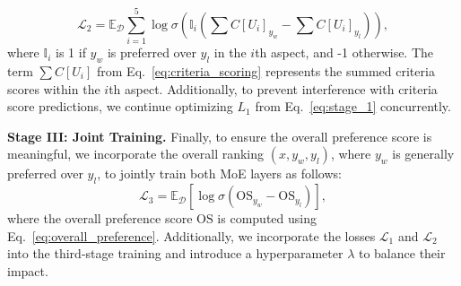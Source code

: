\begin{equation}
    \mathcal{L}_2 = \mathbb{E}_{\mathcal{D}} \sum_{i=1}^{5}  \log \sigma(
          \mathbb{I}_{i} (\sum C[U_i]_{y_w} - \sum C[U_i]_{y_l})
    )
    ,
\end{equation}
where \( \mathbb{I}_{i} \) is 1 if \( y_w \) is preferred over \( y_l \) in the \( i \)th aspect, and -1 otherwise. The term \( \sum C[U_i] \) from Eq.~\eqref{eq:criteria_scoring} represents the summed criteria scores within the \( i \)th aspect. Additionally, to prevent interference with criteria score predictions, we continue optimizing \( L_1 \) from Eq.~\eqref{eq:stage_1} concurrently.

\noindent \textbf{Stage III: Joint Training.}
Finally, to ensure the overall preference score is meaningful, we incorporate the overall ranking \( (x, y_w, y_l) \), where \( y_w \) is generally preferred over \( y_l \), to jointly train both MoE layers as follows:
\begin{equation}
    \mathcal{L}_3 = \mathbb{E}_{\mathcal{D}} \left[ \log \sigma (\textrm{OS}_{y_w} - \textrm{OS}_{y_l})\right]
    ,
\end{equation}
where the overall preference score \(\textrm{OS}\) is computed using Eq.~\eqref{eq:overall_preference}. Additionally, we incorporate the losses \(\mathcal{L}_1\) and \(\mathcal{L}_2\) into the third-stage training and introduce a hyperparameter \( \lambda \) to balance their impact.


